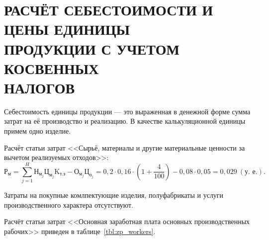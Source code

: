 \section[%
Расчёт себестоимости и цены единицы продукции с учетом \\
косвенных налогов
]{%
РАСЧЁТ СЕБЕСТОИМОСТИ И ЦЕНЫ ЕДИНИЦЫ \\
ПРОДУКЦИИ С УЧЕТОМ КОСВЕННЫХ \\
НАЛОГОВ
}
\label{sec:cost}

Себестоимость единицы продукции --- это выраженная в денежной форме
сумма затрат на её производство и реализацию.
В качестве калькуляционной единицы примем одно изделие.

Расчёт статьи затрат 
<<Сырьё, материалы и другие материальные ценности
за вычетом реализуемых отходов>>:
\begin{equation*}
\text{Р}_{\text{м}} = 
\sum^{H}_{j=1} \text{Н}_{\text{м}_j} \text{Ц}_{\text{м}_j} \text{K}_{\text{т.з}} 
- \text{О}_{\text{м}_j} \text{Ц}_{\text{о}_j} = 
0{,}2 \cdot 0{,}16 \cdot (1 + \dfrac{4}{100}) - 0{,}08 \cdot 0{,}05 =
0{,}029 \: (\text{у.~е.}).
\end{equation*}

Затраты на покупные комлпектующие изделия, 
полуфабрикаты и услуги производственного характера отсутствуют.

Расчёт статьи затрат
<<Основная заработная плата основных производственных рабочих>>
приведен в таблице~\ref{tbl:zp_workers}.

